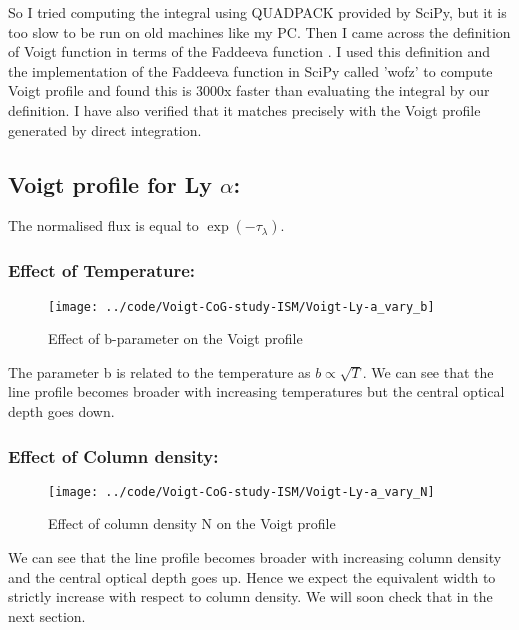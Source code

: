 \documentclass[12pt]{article}
\begin{document}
So I tried computing the integral using QUADPACK provided by SciPy, but it is too slow to be run on old machines like my PC. Then I came across the definition of Voigt function in terms of the Faddeeva function \cite{scipython}. I used this definition and the implementation of the Faddeeva function in SciPy called 'wofz' to compute Voigt profile and found this is 3000x faster than evaluating the integral by our definition. I have also verified that it matches precisely with the Voigt profile generated by direct integration.






\subsection{Voigt profile for Ly $\alpha$:}
The normalised flux is equal to $\exp (-\tau_{\lambda})$.
\subsubsection{Effect of Temperature:}


\begin{figure}[H]
\centering
\texttt{[image: ../code/Voigt-CoG-study-ISM/Voigt-Ly-a\_vary\_b]}
\caption{Effect of b-parameter on the Voigt profile}
\label{fig:voigt-ly-a_vary_b}
\end{figure}

The parameter b is related to the temperature as $b \propto \sqrt{T}$. We can see that the line profile becomes broader with increasing temperatures but the central optical depth goes down.

\subsubsection{Effect of Column density:}

\begin{figure}[H]
\centering
\texttt{[image: ../code/Voigt-CoG-study-ISM/Voigt-Ly-a\_vary\_N]}
\caption{Effect of column density N on the Voigt profile}
\label{fig:voigt-ly-a_vary_N}
\end{figure}

We can see that the line profile becomes broader with increasing column density and the central optical depth goes up. Hence we expect the equivalent width to strictly increase with respect to column density. We will soon check that in the next section.
\end{document}
